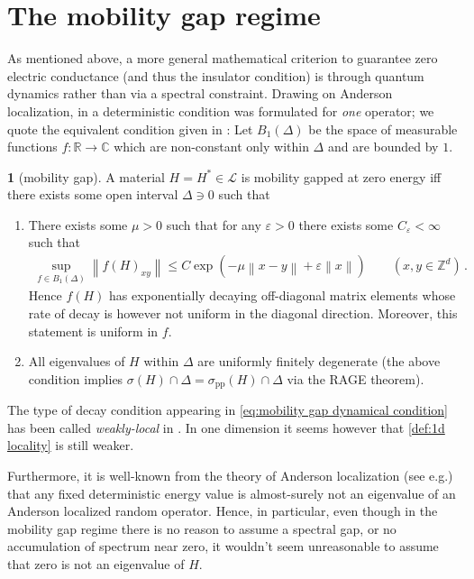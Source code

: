 \documentclass[a4paper,10pt]{article}
\numberwithin{equation}{section}
\theoremstyle{plain}
\theoremstyle{plain}
\theoremstyle{plain}
\theoremstyle{plain}
\theoremstyle{plain}
\theoremstyle{remark}
\theoremstyle{definition}
\newtheorem{defn}[thm]{\protect\definitionname}
\theoremstyle{plain}
\providecommand{\definitionname}{Definition}
\newcommand{\ZZ}{\mathbb{Z}}
\newcommand{\RR}{\mathbb{R}}
\newcommand{\CC}{\mathbb{C}}
\newcommand{\calL}{\mathcal{L}}
\newcommand\norm[1]{\left\lVert#1\right\rVert}
\newcommand{\ve}{\varepsilon}
\newcommand{\eql}[1]{\begin{align}#1\end{align}}
\begin{document}
	\section{The mobility gap regime}\label{sec:mobility gap}
	As mentioned above, a more general mathematical criterion to guarantee zero electric conductance (and thus the insulator condition) is through quantum dynamics rather than via a spectral constraint. Drawing on Anderson localization, in \cite{EGS_2005} a deterministic condition was formulated for \emph{one} operator; we quote the equivalent condition given in \cite[Definition 2.5]{BSS23}:
	Let $B_1(\Delta)$ be the space of measurable functions $f:\RR\to\CC$ which are non-constant only within $\Delta$ and are bounded by $1$.
	\begin{defn}[mobility gap] A material $H=H^\ast\in\calL$ is mobility gapped at zero energy iff there exists some open interval $\Delta\ni0$ such that
		\begin{enumerate}
			\item There exists some $\mu>0$ such that for any $\ve>0$ there exists some $C_\ve<\infty$ such that \eql{\label{eq:mobility gap dynamical condition}\sup_{f\in B_1(\Delta)}\norm{f(H)_{xy}} \leq C\exp(-\mu\norm{x-y}+\ve\norm{x}) \qquad(x,y\in\ZZ^d)\,.} Hence $f(H)$ has exponentially decaying off-diagonal matrix elements whose rate of decay is however not uniform in the diagonal direction. Moreover, this statement is uniform in $f$.
			\item All eigenvalues of $H$ within $\Delta$ are uniformly finitely degenerate (the above condition implies $\sigma(H)\cap\Delta=\sigma_{\mathrm{pp}}(H)\cap\Delta$ via the RAGE theorem).
		\end{enumerate}    
	\end{defn}
	
	The type of decay condition appearing in \cref{eq:mobility gap dynamical condition} has been called \emph{weakly-local} in \cite{Shapiro2019,BSS23}. In one dimension it seems however that \cref{def:1d locality} is still weaker. 
	
	Furthermore, it is well-known from the theory of Anderson localization (see \cite{SimonWolff1986} e.g.) that any fixed deterministic energy value is almost-surely  not an eigenvalue of an Anderson localized random operator. Hence, in particular, even though in the mobility gap regime there is no reason to assume a spectral gap, or no accumulation of spectrum near zero, it wouldn't seem unreasonable to assume that zero is not an eigenvalue of $H$.
	
\end{document}
